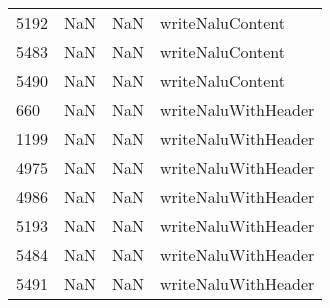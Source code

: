 \begin{tabular}{llll}
5192 &                   NaN &                        NaN &                          writeNaluContent \\
5483 &                   NaN &                        NaN &                          writeNaluContent \\
5490 &                   NaN &                        NaN &                          writeNaluContent \\
660  &                   NaN &                        NaN &                       writeNaluWithHeader \\
1199 &                   NaN &                        NaN &                       writeNaluWithHeader \\
4975 &                   NaN &                        NaN &                       writeNaluWithHeader \\
4986 &                   NaN &                        NaN &                       writeNaluWithHeader \\
5193 &                   NaN &                        NaN &                       writeNaluWithHeader \\
5484 &                   NaN &                        NaN &                       writeNaluWithHeader \\
5491 &                   NaN &                        NaN &                       writeNaluWithHeader \\
\bottomrule
\end{tabular}
